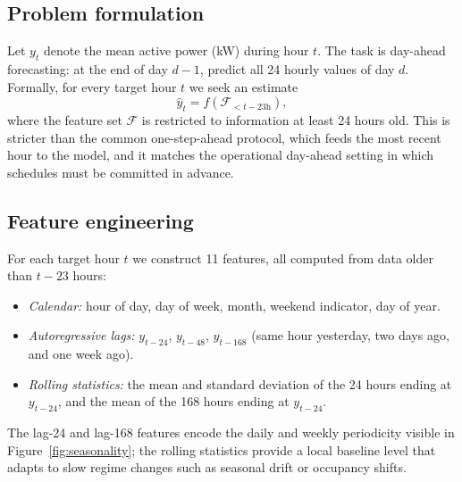 \documentclass[10pt,a4paper]{article}
\begin{document}
\subsection{Problem formulation}
Let $y_t$ denote the mean active power (kW) during hour $t$. The task is day-ahead
forecasting: at the end of day $d-1$, predict all 24 hourly values of day $d$.
Formally, for every target hour $t$ we seek an estimate
\begin{equation}\label{eq:task}
\hat{y}_t = f\!\left(\mathcal{F}_{<t-23\text{h}}\right),
\end{equation}
where the feature set $\mathcal{F}$ is restricted to information at least 24 hours
old. This is stricter than the common one-step-ahead protocol, which feeds the most
recent hour to the model, and it matches the operational day-ahead setting in which
schedules must be committed in advance.

\subsection{Feature engineering}
For each target hour $t$ we construct 11 features, all computed from data older than
$t-23$ hours:
\begin{itemize}[leftmargin=1.6em,itemsep=1pt,topsep=2pt]
\item \emph{Calendar:} hour of day, day of week, month, weekend indicator, day of
      year.
\item \emph{Autoregressive lags:} $y_{t-24}$, $y_{t-48}$, $y_{t-168}$ (same hour
      yesterday, two days ago, and one week ago).
\item \emph{Rolling statistics:} the mean and standard deviation of the 24 hours
      ending at $y_{t-24}$, and the mean of the 168 hours ending at $y_{t-24}$.
\end{itemize}
The lag-24 and lag-168 features encode the daily and weekly periodicity visible in
Figure~\ref{fig:seasonality}; the rolling statistics provide a local baseline level
that adapts to slow regime changes such as seasonal drift or occupancy shifts.
\end{document}
